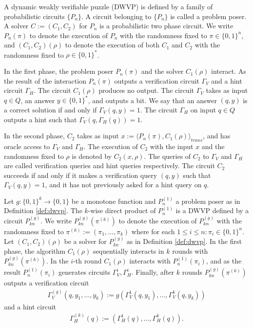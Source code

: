 \noindent
\begin{definition}
  \label{def:dwvp}
  A dynamic weakly verifiable puzzle (DWVP) is defined by a family of probabilistic circuits $\{P_n\}$.
  A circuit belonging to $\{P_n\}$ is called a problem poser.
  A solver $C := (C_1, C_2)$ for $P_n$ is a probabilistic two phase circuit.
  We write $P_n(\pi)$ to denote the execution of $P_n$ with the randomness fixed to $\pi \in \{0,1\}^n$, and $(C_1,C_2)(\rho)$
  to denote the execution of both $C_1$ and $C_2$ with the randomness fixed to $\rho \in \{0,1\}^{*}$.

  In the first phase, the problem poser $P_n(\pi)$ and the solver $C_1(\rho)$ interact.
  As the result of the interaction $P_n(\pi)$ outputs a verification circuit $\Gamma_{V}$ and a hint circuit $\Gamma_{H}$.
  The circuit $C_1(\rho)$ produces no output.
  The circuit $\Gamma_{V}$ takes as input $q \in Q$, an answer $y \in \{0,1\}^*$,
  and outputs a bit. We say that an answer $(q,y)$ is a correct solution if and only if $\Gamma_V(q,y) = 1$.
  The circuit $\Gamma_H$ on input $q \in Q$ outputs a hint such that $\Gamma_V(q,\Gamma_H(q)) = 1$.

  In the second phase, $C_2$ takes as input $x := \langle P_n(\pi), C_1(\rho) \rangle_{\mathit{trans}}$,
  and has oracle access to $\Gamma_V$ and $\Gamma_H$.
  The execution of $C_2$ with the input $x$ and the randomness fixed to $\rho$
  is denoted by $C_2(x, \rho)$. The queries of $C_2$ to $\Gamma_V$ and $\Gamma_H$ are called verification queries and hint queries respectively.
  The circuit $C_2$ succeeds if and only if it makes a verification query $(q,y)$ such that $\Gamma_V(q,y) = 1$,
  and it has not previously asked for a hint query on $q$.
\end{definition}
%
\begin{definition}
  Let $g: \{0,1\}^{k} \rightarrow \{0,1\}$ be a monotone function and $P_n^{(1)}$ a problem poser as in Definition \ref{def:dwvp}.
  The $k$-wise direct product of $P_n^{(1)}$ is a DWVP defined by a circuit $P_{kn}^{(g)}$.
  We write $P_{kn}^{(g)}(\pi^{(k)})$ to denote the execution of $P_{kn}^{(g)}$ with the randomness fixed to $\pi^{(k)} := (\pi_1, \dots, \pi_k)$
  where for each $1 \leq i \leq n : \pi_i \in \{0,1\}^n.$
  Let $(C_1, C_2)(\rho)$ be a solver for $P_{kn}^{(g)}$ as in Definition \ref{def:dwvp}.
  In the first phase, the algorithm $C_1(\rho)$ sequentially interacts in $k$ rounds with $P_{kn}^{(g)}(\pi^{(k)})$.
  In the $i$-th round $C_1(\rho)$ interacts with $P_n^{(1)}(\pi_i)$,
  and as the result $P_{n}^{(1)}(\pi_i)$ generates circuits $\Gamma_V^i, \Gamma_H^i$.
  Finally, after $k$ rounds $P_{kn}^{(g)}(\pi^{(k)})$ outputs a verification circuit
\begin{align*}
  \Gamma_V^{(g)} (q, y_1, \dots, y_k) := g(\Gamma_V^{1}(q, y_1), \dots, \Gamma_V^{k}(q, y_k))
\end{align*}
and a hint circuit
\begin{align*}
  \Gamma_H^{(k)} (q) := (\Gamma_H^{1}(q), \dots, \Gamma_H^{k}(q)).
\end{align*}
\end{definition}
